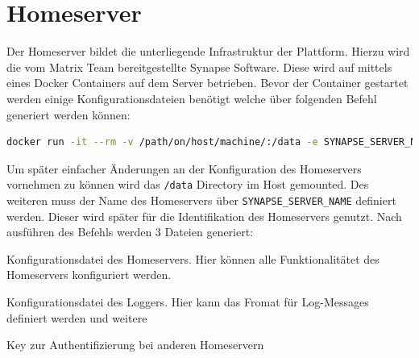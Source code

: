     \section{Homeserver}\label{sec:homeserver}
    Der Homeserver bildet die unterliegende Infrastruktur der Plattform.
    Hierzu wird die vom Matrix Team bereitgestellte Synapse Software.
    Diese wird auf mittels eines Docker Containers auf dem Server betrieben.
    Bevor der Container gestartet werden einige Konfigurationsdateien benötigt welche über folgenden Befehl generiert werden können:
    \begin{lstlisting}[language=bash,label={lst:synapse-generate}]
        docker run -it --rm -v /path/on/host/machine/:/data -e SYNAPSE_SERVER_NAME=my.matrix.host -e SYNAPSE_REPORT_STATS=yes matrixdotorg/synapse:latest generate
    \end{lstlisting}
    Um später einfacher Änderungen an der Konfiguration des Homeservers vornehmen zu können wird das \texttt{/data} Directory im Host gemounted.
    Des weiteren muss der Name des Homeservers über \texttt{SYNAPSE\_SERVER\_NAME} definiert werden.
    Dieser wird später für die Identifikation des Homeservers genutzt.
    Nach ausführen des Befehls werden 3 Dateien generiert:
    \begin{description}[leftmargin=!,labelwidth=4cm]
        \item [homeserver.yaml] Konfigurationsdatei des Homeservers. Hier können alle Funktionalitätet des Homeservers konfiguriert werden.
        \item [my.matrix.host.log.config] Konfigurationsdatei des Loggers. Hier kann das Fromat für Log-Messages definiert werden und weitere
        \item [my.matrix.host.signing.key] Key zur Authentifizierung bei anderen Homeservern
    \end{description}

